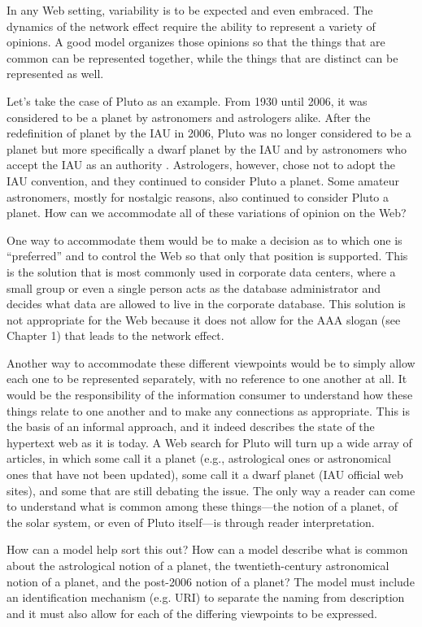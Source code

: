 In any Web setting, variability is to be expected and even embraced. The
dynamics of the network effect require the ability to represent a
variety of opinions. A good model organizes those opinions so that the
things that are common can be represented together, while the things
that are distinct can be represented as well.

Let's take the case of Pluto as an example. From 1930 until 2006, it was
considered to be a planet by astronomers and astrologers alike. After
the redefinition of planet by the IAU in 2006, Pluto was no longer
considered to be a planet but more specifically a dwarf planet by the
IAU and by astronomers who accept the IAU as an authority \cite{zielinski2006pluto}. Astrologers,
however, chose not to adopt the IAU convention, and they continued to
consider Pluto a planet. Some amateur astronomers, mostly for nostalgic
reasons, also continued to consider Pluto a planet. How can we
accommodate all of these variations of opinion on the Web?

One way to accommodate them would be to make a decision as to which one
is ``preferred'' and to control the Web so that only that position is
supported. This is the solution that is most commonly used in corporate
data centers, where a small group or even a single person acts as the
database administrator and decides what data are allowed to live in the
corporate database. This solution is not appropriate for the Web because
it does not allow for the AAA slogan (see Chapter 1) that leads to the
network effect.

Another way to accommodate these different viewpoints would be to simply
allow each one to be represented separately, with no reference to one
another at all. It would be the responsibility of the information
consumer to understand how these things relate to one another and to
make any connections as appropriate. This is the basis of an informal
approach, and it indeed describes the state of the hypertext web as it is
today. A Web search for Pluto will turn up a wide array of articles, in
which some call it a planet (e.g., astrological ones or astronomical
ones that have not been updated), some call it a dwarf planet (IAU
official web sites), and some that are still debating the issue. The
only way a reader can come to understand what is common among these
things---the notion of a planet, of the solar system, or even of Pluto
itself---is through reader interpretation.

How can a model help sort this out? How can a model describe what is
common about the astrological notion of a planet, the twentieth-century
astronomical notion of a planet, and the post-2006 notion of a planet?
The model must include an identification mechanism (e.g. URI) to
separate the naming from description and it must also allow for each of
the differing viewpoints to be expressed.

